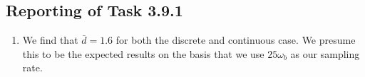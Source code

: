 \documentclass[11pt]{article} %
\begin{document}
\subsection*{Reporting of Task 3.9.1}
\begin{enumerate}
\item We find that $\bar{d} = 1.6$ for both the discrete and
  continuous case. We presume this to be the expected results on the
  basis that we use $25\omega_b$ as our sampling rate.
\end{enumerate}
\end{document}
